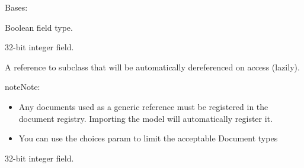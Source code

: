 \documentclass[letterpaper,10pt,english]{sphinxmanual}
\begin{document}
\begin{fulllineitems}
\label{\detokenize{flashedge_response:flashedge_response.FlashedgeResponse}}
Bases: 

\begin{fulllineitems}
\label{\detokenize{flashedge_response:flashedge_response.FlashedgeResponse.correct}}
Boolean field type.


\end{fulllineitems}


\begin{fulllineitems}
\label{\detokenize{flashedge_response:flashedge_response.FlashedgeResponse.end}}
32-bit integer field.

\end{fulllineitems}


\begin{fulllineitems}
\label{\detokenize{flashedge_response:flashedge_response.FlashedgeResponse.reference}}
A reference to   subclass
that will be automatically dereferenced on access (lazily).

\begin{sphinxadmonition}{note}{Note:}\begin{itemize}
\item {} 
Any documents used as a generic reference must be registered in the
document registry.  Importing the model will automatically register
it.

\item {} 
You can use the choices param to limit the acceptable Document types

\end{itemize}
\end{sphinxadmonition}


\end{fulllineitems}


\begin{fulllineitems}
\label{\detokenize{flashedge_response:flashedge_response.FlashedgeResponse.start}}
32-bit integer field.

\end{fulllineitems}


\end{fulllineitems}
\end{document}

